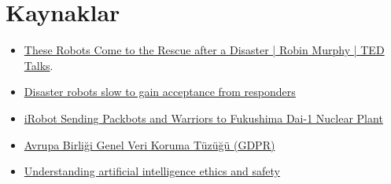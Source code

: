 \documentclass{article}
\begin{document}
\section*{Kaynaklar}
\begin{itemize}
    \item \href{https://www.youtube.com/watch?v=wG4RnDNWtJo}{These Robots Come to the Rescue after a Disaster | Robin Murphy | TED Talks}.
    \item \href{https://www.zdnet.com/article/disaster-robots-slow-to-gain-acceptance-from-responders/}{Disaster robots slow to gain acceptance from responders}
    \item \href{https://spectrum.ieee.org/irobot-sending-packbots-and-warriors-to-fukushima}{iRobot Sending Packbots and Warriors to Fukushima Dai-1 Nuclear Plant}
    \item \href{https://www.kisiselverilerinkorunmasi.org/mevzuat/avrupa-birligi-genel-veri-koruma-tuzugu-gdpr-turkce-ceviri/}{Avrupa Birliği Genel Veri Koruma Tüzüğü (GDPR)}
    \item \href{https://www.gov.uk/guidance/understanding-artificial-intelligence-ethics-and-safety}{Understanding artificial intelligence ethics and safety}
\end{itemize}
\end{document}
